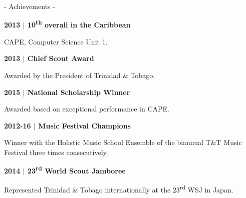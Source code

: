 \documentclass{article}
\newcommand{\ts}{\textsuperscript}
\begin{document}
\begin{minipage}[t]{0.35\textwidth}
{\LARGE\sc - Achievements -} \smallskip\par
{\footnotesize\sffamily\bf 2013 $|$ {\small10\ts{th} overall in the Caribbean}}\par
{\small{}\selectfont CAPE, Computer Science Unit 1.}\par
{\footnotesize\sffamily\bf 2013 $|$ {\small Chief Scout Award}}\par
{\small{}\selectfont Awarded by the President of Trinidad \& Tobago.}\par
{\footnotesize\sffamily\bf 2015 $|$ {\small National Scholarship Winner}}\par
{\small{}\selectfont Awarded based on exceptional performance in CAPE.}\par
{\footnotesize\sffamily\bf 2012-16 $|$ {\small Music Festival Champions}}\par
{\small{}\selectfont Winner with the Holistic Music School Ensemble of the biannual T\&T Music Festival three times consecutively.}\par
{\footnotesize\sffamily\bf 2014 $|$ {\small 23\ts{rd} World Scout Jamboree}}\par
{\small{}\selectfont Represented Trinidad \& Tobago internationally at the 23\ts{rd} WSJ in Japan.}
\bigskip

 \par


\end{minipage}
\hfill
\end{document}
